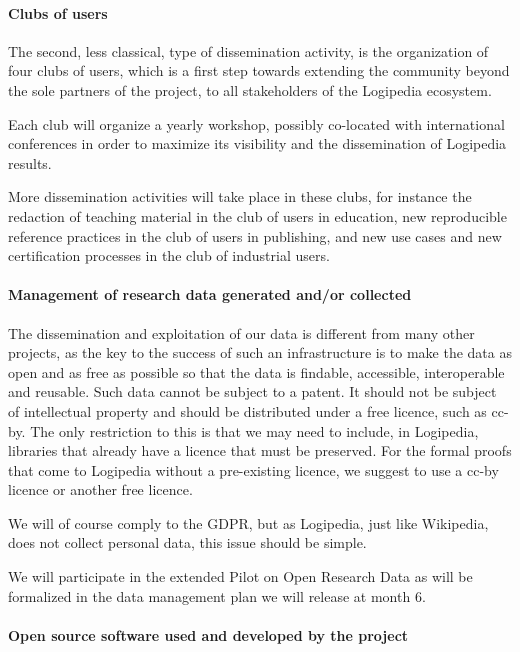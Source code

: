 \paragraph*{Clubs of users}

The second, less classical, type of dissemination activity, is the
organization of four clubs of users, which is a first step towards
extending the community beyond the sole partners of
the project, to all stakeholders of the Logipedia ecosystem.

Each club will organize a yearly workshop, possibly co-located with
international conferences in order to maximize its visibility
and the dissemination of Logipedia results.

More dissemination activities will take place in these clubs,
for instance the redaction of teaching material in the club of users in
education, new reproducible reference practices in the club of users
in publishing, and new use cases and new certification processes in the
club of industrial users.

\paragraph*{Management of research data generated and/or collected}

The dissemination and exploitation of our data is different from many
other projects, as the key to the success of such an infrastructure is
to make the data as open and as free as possible so that the data is
findable, accessible, interoperable and reusable. Such data cannot be
subject to a patent. It should not be subject of intellectual property
and should be distributed under a free licence, such as cc-by. The only
restriction to this is that we may need to include, in Logipedia,
libraries that already have a licence that must be preserved.  For the
formal proofs that come to Logipedia without a pre-existing licence,
we suggest to use a cc-by licence or another free licence.

We will of course comply to the GDPR, but as Logipedia, just like 
Wikipedia, does not collect personal data, this issue should be simple.

We will participate in the extended Pilot on Open Research Data as
will be formalized in the data management plan we will release at
month 6.

\paragraph*{Open source software used and developed by the project}

